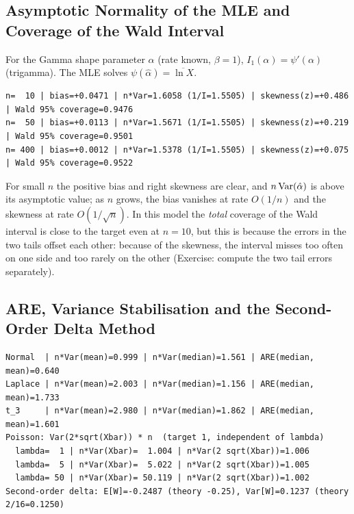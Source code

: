 \documentclass[main.tex]{subfiles}
\begin{document}
\subsection{Asymptotic Normality of the MLE and Coverage of the Wald Interval}
For the Gamma shape parameter $\alpha$ (rate known, $\beta=1$), $I_1(\alpha)=\psi'(\alpha)$ (trigamma). The MLE solves $\psi(\hat\alpha)=\overline{\ln X}$.

\begin{lstlisting}[style=output]
n=  10 | bias=+0.0471 | n*Var=1.6058 (1/I=1.5505) | skewness(z)=+0.486 | Wald 95% coverage=0.9476
n=  50 | bias=+0.0113 | n*Var=1.5671 (1/I=1.5505) | skewness(z)=+0.219 | Wald 95% coverage=0.9501
n= 400 | bias=+0.0012 | n*Var=1.5378 (1/I=1.5505) | skewness(z)=+0.075 | Wald 95% coverage=0.9522
\end{lstlisting}

For small $n$ the positive bias and right skewness are clear, and $n\operatorname{Var}(\hat\alpha)$ is above its asymptotic value; as $n$ grows, the bias vanishes at rate $O(1/n)$ and the skewness at rate $O(1/\sqrt n)$. In this model the \emph{total} coverage of the Wald interval is close to the target even at $n=10$, but this is because the errors in the two tails offset each other: because of the skewness, the interval misses too often on one side and too rarely on the other (Exercise: compute the two tail errors separately).

\subsection{ARE, Variance Stabilisation and the Second-Order Delta Method}

\begin{lstlisting}[style=output]
Normal  | n*Var(mean)=0.999 | n*Var(median)=1.561 | ARE(median, mean)=0.640
Laplace | n*Var(mean)=2.003 | n*Var(median)=1.156 | ARE(median, mean)=1.733
t_3     | n*Var(mean)=2.980 | n*Var(median)=1.862 | ARE(median, mean)=1.601
Poisson: Var(2*sqrt(Xbar)) * n  (target 1, independent of lambda)
  lambda=  1 | n*Var(Xbar)=  1.004 | n*Var(2 sqrt(Xbar))=1.006
  lambda=  5 | n*Var(Xbar)=  5.022 | n*Var(2 sqrt(Xbar))=1.005
  lambda= 50 | n*Var(Xbar)= 50.119 | n*Var(2 sqrt(Xbar))=1.002
Second-order delta: E[W]=-0.2487 (theory -0.25), Var[W]=0.1237 (theory 2/16=0.1250)
\end{lstlisting}
\end{document}
